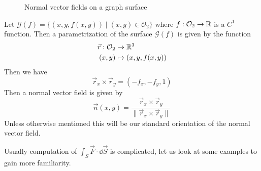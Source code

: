 \documentclass[../Analysis-3.tex]{subfiles}
\begin{document}
\begin{Eg}{}{}
  \begin{figure}
    \centering
    \caption{Normal vector fields on a graph surface}
    \label{fig2:27}
  \end{figure}
  Let $\mathcal{G}(f) = \{ (x,y,f(x,y)) \mid (x,y) \in \mathcal{O}_2\}$ where $f : \mathcal{O}_2 \to \mathbb{R}$ is a $C^1$ function. Then a parametrization of the surface $\mathcal{G}(f)$ is given by the function
  \begin{align*}
    \vec{r} : \mathcal{O}_2 & \to \mathbb{R}^3             \\
    (x,y)                   & \mapsto (x,y,f(x,y))
  \end{align*}
  Then we have
  \[
    \vec{r}_x \times \vec{r}_y = (-f_x, -f_y, 1)
  \]
  Then a normal vector field is given by
  \[
    \vec{n}(x,y) = \frac{\vec{r}_x \times \vec{r}_y}{\|\vec{r}_x \times \vec{r}_y \|}
  \]
  Unless otherwise mentioned this will be our standard orientation of the normal vector field.
\end{Eg}

Usually computation of $\int_S \vec{F} \cdot \dd \vec{S}$ is complicated, let us look at some examples to gain more familiarity.
\end{document}
